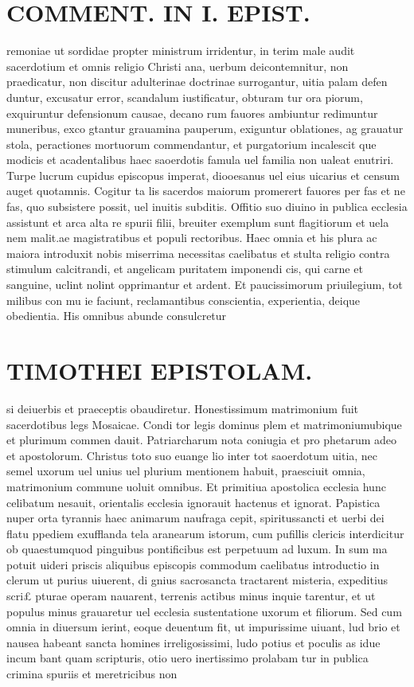 \documentclass{article}
\begin{document}
\begin{pages}
\section*{COMMENT. IN I. EPIST. }
\marginpar{[ p.70 ]}\pstart remoniae ut sordidae propter ministrum irridentur, in terim male audit sacerdotium et omnis religio Christi ana, uerbum deicontemnitur, non praedicatur, non discitur adulterinae doctrinae surrogantur, uitia palam defen duntur, excusatur error, scandalum iustificatur, obturam tur ora piorum, exquiruntur defensionum causae, decano rum fauores ambiuntur redimuntur muneribus, exco gtantur grauamina pauperum, exiguntur oblationes, ag grauatur stola, peractiones mortuorum commendantur, et purgatorium incalescit que modicis et acadentalibus haec saoerdotis famula uel familia non ualeat enutriri. Turpe lucrum cupidus episcopus imperat, diooesanus uel eius uicarius et censum auget quotamnis. Cogitur ta lis sacerdos maiorum promerert fauores per fas et ne fas, quo subsistere possit, uel inuitis subditis. Offitio suo diuino in publica ecclesia assistunt et arca alta re spurii filii, breuiter exemplum sunt flagitiorum et uela nem malit.ae magistratibus et populi rectoribus. Haec omnia et his plura ac maiora introduxit nobis miserrima necessitas caelibatus et stulta religio contra stimulum calcitrandi, et angelicam puritatem imponendi cis, qui carne et sanguine, uclint nolint opprimantur et ardent. Et paucissimorum priuilegium, tot milibus con mu ie faciunt, reclamantibus conscientia, experientia, deique obedientia. His omnibus abunde consulcretur  \pend
\section*{TIMOTHEI EPISTOLAM. }
\marginpar{[ p.71 ]}\pstart si deiuerbis et praeceptis obaudiretur. Honestissimum matrimonium fuit sacerdotibus legs Mosaicae. Condi tor legis dominus plem et matrimoniumubique et plurimum commen dauit. Patriarcharum nota coniugia et pro phetarum adeo et apostolorum. Christus toto suo euange lio inter tot saoerdotum uitia, nec semel uxorum uel unius uel plurium mentionem habuit, praesciuit omnia, matrimonium commune uoluit omnibus. Et primitiua apostolica ecclesia hunc celibatum nesauit, orientalis ecclesia ignorauit hactenus et ignorat. Papistica nuper orta tyrannis haec animarum naufraga cepit, spiritussancti et uerbi dei flatu ppediem exufflanda tela aranearum istorum, cum pufillis clericis interdicitur ob quaestumquod pinguibus pontificibus est perpetuum ad luxum. In sum ma potuit uideri priscis aliquibus episcopis commodum caelibatus introductio in clerum ut purius uiuerent, di gnius sacrosancta tractarent misteria, expeditius scri£ pturae operam nauarent, terrenis actibus minus inquie tarentur, et ut populus minus grauaretur uel ecclesia sustentatione uxorum et filiorum. Sed cum omnia in diuersum ierint, eoque deuentum fit, ut impurissime uiuant, lud brio et nausea habeant sancta homines irreligosissimi, ludo potius et poculis as idue incum bant quam scripturis, otio uero inertissimo prolabam tur in publica crimina spuriis et meretricibus non  \pend

\end{pages}
\end{document}
